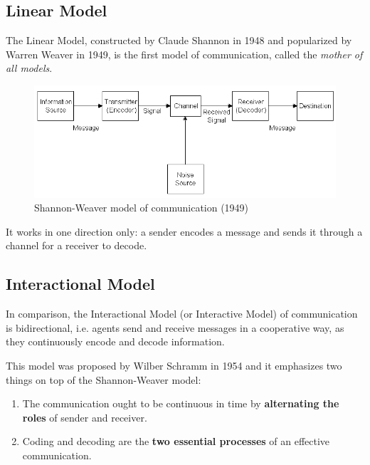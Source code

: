 \documentclass[12pt]{article}
\begin{document}
\subsection{Linear Model}
The Linear Model, constructed by Claude Shannon in 1948 and popularized by Warren Weaver in 1949, is the first model of communication, called the \textit{mother of all models}\cite{mothermodel}.

\begin{figure}[htp]
    \centering
    \includegraphics[width=\textwidth]{lin.png}
    \caption{Shannon-Weaver model of communication (1949)}
    \label{lin}
\end{figure}

It works in one direction only: a sender encodes a message and sends it through a channel for a receiver to decode.

\subsection{Interactional Model}
In comparison, the Interactional Model (or Interactive Model) of communication is bidirectional, i.e. agents send and receive messages in a cooperative way, as they continuously encode and decode information. \pagebreak \par
This model was proposed by Wilber Schramm in 1954 and it emphasizes two things on top of the Shannon-Weaver model:

\begin{enumerate}
    \item The communication ought to be continuous in time by \textbf{alternating the roles} of sender and receiver.
    \item Coding and decoding are the \textbf{two essential processes} of an effective communication.
\end{enumerate}
\end{document}
